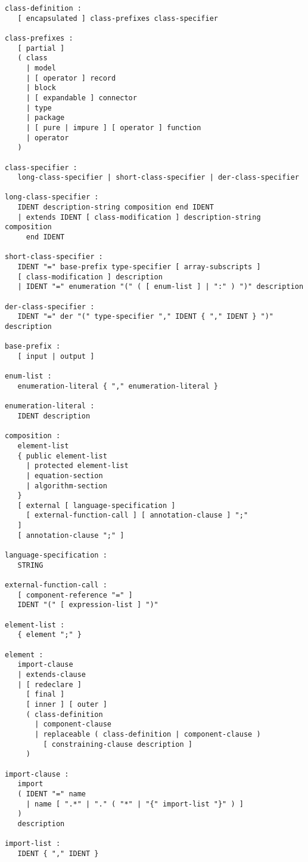 \begin{lstlisting}[language=grammar]
class-definition :
   [ encapsulated ] class-prefixes class-specifier

class-prefixes :
   [ partial ]
   ( class
     | model
     | [ operator ] record
     | block
     | [ expandable ] connector
     | type
     | package
     | [ pure | impure ] [ operator ] function
     | operator
   )

class-specifier :
   long-class-specifier | short-class-specifier | der-class-specifier

long-class-specifier :
   IDENT description-string composition end IDENT
   | extends IDENT [ class-modification ] description-string composition
     end IDENT

short-class-specifier :
   IDENT "=" base-prefix type-specifier [ array-subscripts ]
   [ class-modification ] description
   | IDENT "=" enumeration "(" ( [ enum-list ] | ":" ) ")" description

der-class-specifier :
   IDENT "=" der "(" type-specifier "," IDENT { "," IDENT } ")" description

base-prefix :
   [ input | output ]

enum-list :
   enumeration-literal { "," enumeration-literal }

enumeration-literal :
   IDENT description

composition :
   element-list
   { public element-list
     | protected element-list
     | equation-section
     | algorithm-section
   }
   [ external [ language-specification ]
     [ external-function-call ] [ annotation-clause ] ";"
   ]
   [ annotation-clause ";" ]

language-specification :
   STRING

external-function-call :
   [ component-reference "=" ]
   IDENT "(" [ expression-list ] ")"

element-list :
   { element ";" }

element :
   import-clause
   | extends-clause
   | [ redeclare ]
     [ final ]
     [ inner ] [ outer ]
     ( class-definition
       | component-clause
       | replaceable ( class-definition | component-clause )
         [ constraining-clause description ]
     )

import-clause :
   import
   ( IDENT "=" name
     | name [ ".*" | "." ( "*" | "{" import-list "}" ) ]
   )
   description

import-list :
   IDENT { "," IDENT }
\end{lstlisting}

